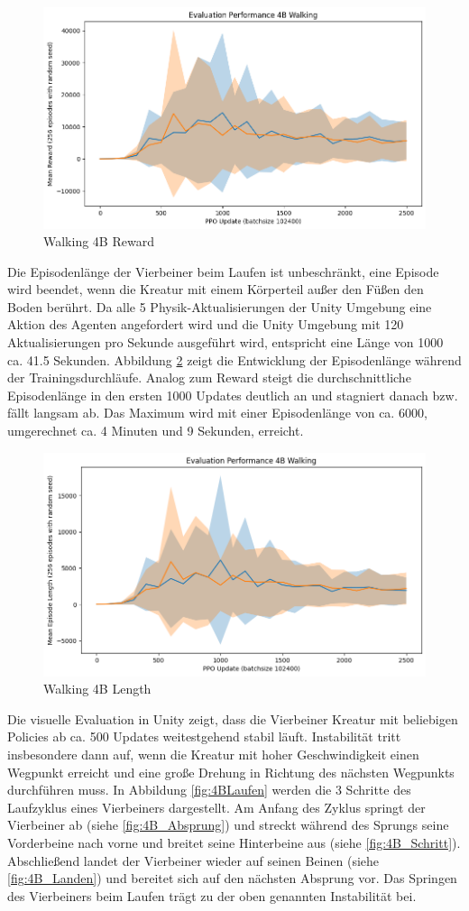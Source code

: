 \begin{figure}[ht]
    \centering
    \includegraphics[width=0.5\linewidth]{resources/img/results/Walking4B_Reward.png}
    \caption{Walking 4B Reward}\label{fig:Walking4B_Reward}
\end{figure}
Die Episodenlänge der Vierbeiner beim Laufen ist unbeschränkt, eine Episode wird beendet, wenn die Kreatur mit einem Körperteil außer den Füßen den Boden berührt. Da alle 5 Physik-Aktualisierungen der Unity Umgebung eine Aktion des Agenten angefordert wird und die Unity Umgebung mit 120 Aktualisierungen pro Sekunde ausgeführt wird, entspricht eine Länge von 1000 ca. 41.5 Sekunden. Abbildung \ref{fig:Walking4B_Length} zeigt die Entwicklung der Episodenlänge während der Trainingsdurchläufe. Analog zum Reward steigt die durchschnittliche Episodenlänge in den ersten 1000 Updates deutlich an und stagniert danach bzw. fällt langsam ab. Das Maximum wird mit einer Episodenlänge von ca. 6000, umgerechnet ca. 4 Minuten und 9 Sekunden, erreicht.

\begin{figure}[ht]
    \centering
    \includegraphics[width=0.5\linewidth]{resources/img/results/Walking4B_Length.png}
    \caption{Walking 4B Length}\label{fig:Walking4B_Length}
\end{figure}

Die visuelle Evaluation in Unity zeigt, dass die Vierbeiner Kreatur mit beliebigen Policies ab ca. 500 Updates weitestgehend stabil läuft. Instabilität tritt insbesondere dann auf, wenn die Kreatur mit hoher Geschwindigkeit einen Wegpunkt erreicht und eine große Drehung in Richtung des nächsten Wegpunkts durchführen muss.\newline
In Abbildung \ref{fig:4BLaufen} werden die 3 Schritte des Laufzyklus eines Vierbeiners dargestellt. Am Anfang des Zyklus springt der Vierbeiner ab (siehe \ref{fig:4B_Absprung}) und streckt während des Sprungs seine Vorderbeine nach vorne und breitet seine Hinterbeine aus (siehe \ref{fig:4B_Schritt}). Abschließend landet der Vierbeiner wieder auf seinen Beinen (siehe \ref{fig:4B_Landen}) und bereitet sich auf den nächsten Absprung vor. Das Springen des Vierbeiners beim Laufen trägt zu der oben genannten Instabilität bei.


